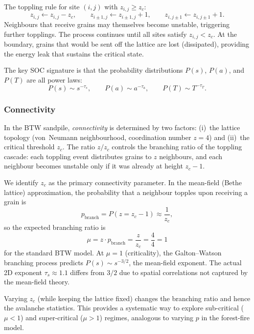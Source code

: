 \documentclass[preprint,12pt]{elsarticle}
\begin{document}
The toppling rule for site $(i,j)$ with $z_{i,j}\ge z_c$:
\begin{equation}
  z_{i,j} \gets z_{i,j} - z_c, \qquad
  z_{i\pm1,j} \gets z_{i\pm1,j} + 1, \qquad
  z_{i,j\pm1} \gets z_{i,j\pm1} + 1.
  \label{eq:topple}
\end{equation}
Neighbours that receive grains may themselves become unstable, triggering
further topplings.
The process continues until all sites satisfy $z_{i,j}<z_c$.
At the boundary, grains that would be sent off the lattice are lost
(dissipated), providing the energy leak that sustains the critical state.

The key SOC signature is that the probability distributions
$P(s)$, $P(a)$, and $P(T)$ are all power laws:
\begin{equation}
  P(s) \sim s^{-\tau_s}, \qquad
  P(a) \sim a^{-\tau_a}, \qquad
  P(T) \sim T^{-\tau_T}.
  \label{eq:exponents}
\end{equation}

\subsubsection*{Connectivity}

In the BTW sandpile, \emph{connectivity} is determined by two factors:
(i)~the lattice topology (von~Neumann neighbourhood, coordination
number $z=4$) and (ii)~the critical threshold $z_c$.
The ratio $z/z_c$ controls the branching ratio of the toppling cascade:
each toppling event distributes grains to $z$ neighbours, and each
neighbour becomes unstable only if it was already at height $z_c-1$.

We identify $z_c$ as the primary connectivity parameter.
In the mean-field (Bethe lattice) approximation, the probability that
a neighbour topples upon receiving a grain is
\begin{equation}
  p_\mathrm{branch} = P(z = z_c - 1) \approx \frac{1}{z_c},
  \label{eq:branch}
\end{equation}
so the expected branching ratio is
\begin{equation}
  \mu = z \cdot p_\mathrm{branch} = \frac{z}{z_c} = \frac{4}{4} = 1
  \label{eq:mu}
\end{equation}
for the standard BTW model.
At $\mu=1$ (criticality), the Galton--Watson branching process predicts
$P(s)\sim s^{-3/2}$, the mean-field exponent.
The actual 2D exponent $\tau_s\approx1.1$ differs from $3/2$ due to
spatial correlations not captured by the mean-field theory.

Varying $z_c$ (while keeping the lattice fixed) changes the branching
ratio and hence the avalanche statistics.
This provides a systematic way to explore sub-critical ($\mu<1$) and
super-critical ($\mu>1$) regimes, analogous to varying $p$ in the
forest-fire model.
\end{document}
